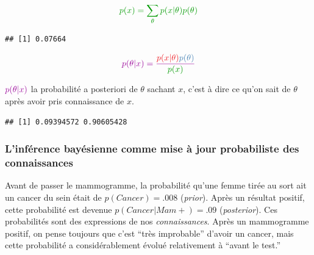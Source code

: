 \documentclass[
  a4paper,11pt,twoside,onecolumn,openright,final,oldfontcommands]{memoir}
\newenvironment{Shaded}{\begin{snugshade}}{\end{snugshade}}
\newcommand{\FunctionTok}[1]{\textcolor[rgb]{0.00,0.00,0.00}{#1}}
\newcommand{\NormalTok}[1]{#1}
\newcommand{\OtherTok}[1]{\textcolor[rgb]{0.56,0.35,0.01}{#1}}
\newcommand{\SpecialCharTok}[1]{\textcolor[rgb]{0.00,0.00,0.00}{#1}}
\newcommand{\StringTok}[1]{\textcolor[rgb]{0.31,0.60,0.02}{#1}}
\theoremstyle{definition}
\theoremstyle{definition}
\theoremstyle{definition}
\theoremstyle{remark}
\begin{document}
\[\color{green}{p(x)=\sum\limits_{\theta}p(x|\theta)p(\theta)}\]

\begin{Shaded}
\end{Shaded}

\begin{verbatim}
## [1] 0.07664
\end{verbatim}

\[
\color{purple}{p(\theta \vert x)} = \dfrac{\color{orangered}{p(x\vert \theta)} \color{steelblue}{p(\theta)}}{\color{green}{p(x)}}
\]

\(\color{purple}{p(\theta \vert x)}\) { la probabilité a posteriori de \(\theta\) sachant \(x\), c'est à dire ce qu'on sait de \(\theta\) après avoir pris connaissance de \(x\).}

\begin{Shaded}
\end{Shaded}

\begin{verbatim}
## [1] 0.09394572 0.90605428
\end{verbatim}

\hypertarget{linfuxe9rence-bayuxe9sienne-comme-mise-uxe0-jour-probabiliste-des-connaissances}{%
\subsubsection{L'inférence bayésienne comme mise à jour probabiliste des connaissances}\label{linfuxe9rence-bayuxe9sienne-comme-mise-uxe0-jour-probabiliste-des-connaissances}}

Avant de passer le mammogramme, la probabilité qu'une femme tirée au sort ait un cancer du sein était de \(p(Cancer)=.008\) (\emph{prior}). Après un résultat positif, cette probabilité est devenue \(p(Cancer|Mam+)=.09\) (\emph{posterior}). Ces probabilités sont des expressions de nos \emph{connaissances}. Après un mammogramme positif, on pense toujours que c'est ``très improbable'' d'avoir un cancer, mais cette probabilité a considérablement évolué relativement à ``avant le test.''
\end{document}
